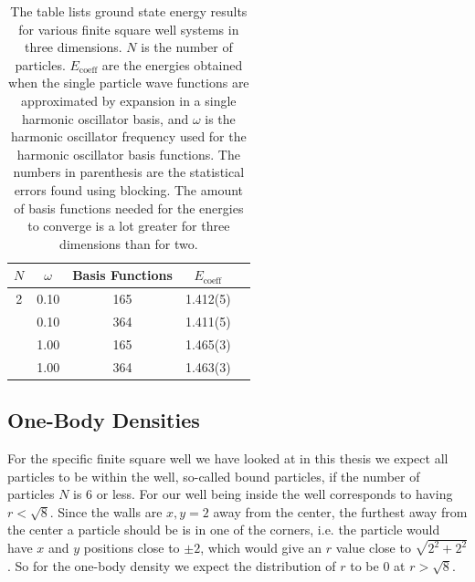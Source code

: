\documentclass[../main.tex]{subfiles}
\begin{document}
\begin{table}[!ht]
  \centering
  \begin{tabular}{c c c c c}
    \hline
    \hline
    $N$ & $\omega$ & Basis Functions & $E_\textrm{coeff}$ \\*
    \hline
    2 & 0.10 & 165 & 1.412(5) \\*
      & 0.10 & 364 & 1.411(5) \\*
      & 1.00 & 165 & 1.465(3) \\*
      & 1.00 & 364 & 1.463(3) \\*
    \hline
    \hline
  \end{tabular}
  \caption{The table lists ground state energy results for various finite square well systems in three dimensions. $N$ is the number of particles. $E_\textrm{coeff}$ are the energies obtained when the single particle wave functions are approximated by expansion in a single harmonic oscillator basis, and $\omega$ is the harmonic oscillator frequency used for the harmonic oscillator basis functions. The numbers in parenthesis are the statistical errors found using blocking. The amount of basis functions needed for the energies to converge is a lot greater for three dimensions than for two.}
  \label{tab: EnergiesFSW3D}
\end{table}

\subsection{One-Body Densities}

For the specific finite square well we have looked at in this thesis we expect all particles to be within the well, so-called bound particles, if the number of particles $N$ is $6$ or less. For our well being inside the well corresponds to having $r<\sqrt{8}$. Since the walls are $x,y = 2$ away from the center, the furthest away from the center a particle should be is in one of the corners, i.e. the particle would have $x$ and $y$ positions close to $\pm 2$, which would give an $r$ value close to $\sqrt{2^2 + 2^2}$. So for the one-body density we expect the distribution of $r$ to be $0$ at $r>\sqrt{8}$. 
\end{document}
